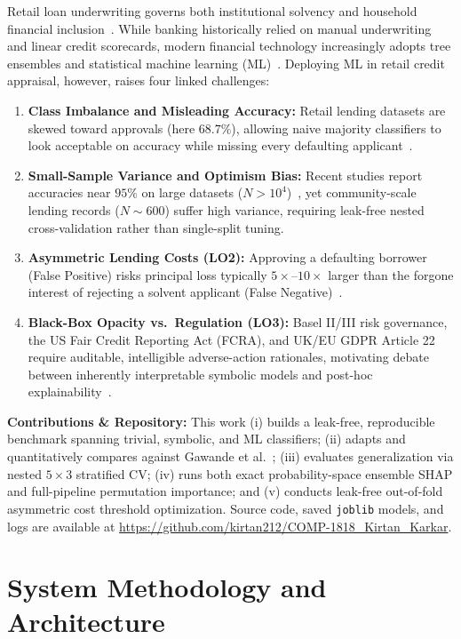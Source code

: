 \documentclass{COMPXXXX}
\begin{document}
Retail loan underwriting governs both institutional solvency and household financial inclusion~\cite{lessmann2015}. While banking historically relied on manual underwriting and linear credit scorecards, modern financial technology increasingly adopts tree ensembles and statistical machine learning (ML)~\cite{bussmann2021,dumitrescu2022}. Deploying ML in retail credit appraisal, however, raises four linked challenges:
\begin{enumerate}
    \item \textbf{Class Imbalance and Misleading Accuracy:} Retail lending datasets are skewed toward approvals (here $68.7\%$), allowing naive majority classifiers to look acceptable on accuracy while missing every defaulting applicant~\cite{hand2009,chen2024}.
    \item \textbf{Small-Sample Variance and Optimism Bias:} Recent studies report accuracies near $95\%$ on large datasets ($N > 10^4$)~\cite{gawande2026}, yet community-scale lending records ($N \sim 600$) suffer high variance, requiring leak-free nested cross-validation rather than single-split tuning.
    \item \textbf{Asymmetric Lending Costs (LO2):} Approving a defaulting borrower (False Positive) risks principal loss typically $5\times$--$10\times$ larger than the forgone interest of rejecting a solvent applicant (False Negative)~\cite{hand2009,lessmann2015}.
    \item \textbf{Black-Box Opacity vs.\ Regulation (LO3):} Basel II/III risk governance, the US Fair Credit Reporting Act (FCRA), and UK/EU GDPR Article 22 require auditable, intelligible adverse-action rationales, motivating debate between inherently interpretable symbolic models and post-hoc explainability~\cite{rudin2019,bussmann2021,bueff2022}.
\end{enumerate}

\noindent\textbf{Contributions \& Repository:} This work (i) builds a leak-free, reproducible benchmark spanning trivial, symbolic, and ML classifiers; (ii) adapts and quantitatively compares against Gawande et al.~\cite{gawande2026}; (iii) evaluates generalization via nested $5\times 3$ stratified CV; (iv) runs both exact probability-space ensemble SHAP and full-pipeline permutation importance; and (v) conducts leak-free out-of-fold asymmetric cost threshold optimization. Source code, saved \texttt{joblib} models, and logs are available at \url{https://github.com/kirtan212/COMP-1818_Kirtan_Karkar}.

\section{System Methodology and Architecture}
\label{sec:methodology}
\end{document}
